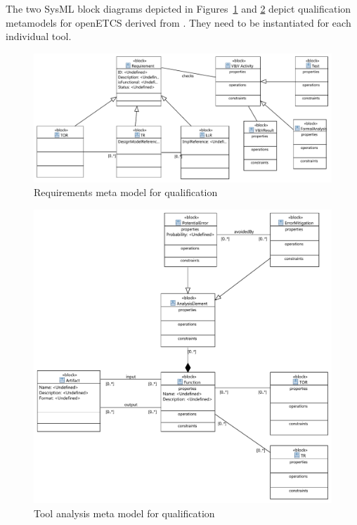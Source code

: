 The two SysML block diagrams depicted in Figures~\ref{fig:requirements_model} and \ref{fig:tool_analysis_model} depict qualification metamodels for openETCS derived from \cite{slotosch_model-based_2012}. They need to be instantiated for each individual tool.

\begin{figure}
\includegraphics[width=\textwidth]{RequirementsModel.pdf}
\caption{Requirements meta model for qualification}
\label{fig:requirements_model}
\end{figure}

\begin{figure}
\includegraphics[width=\textwidth]{ToolAnalysisModel.pdf}
\caption{Tool analysis meta model for qualification}
\label{fig:tool_analysis_model}
\end{figure}

